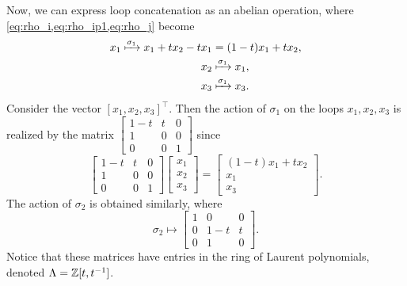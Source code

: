 \begin{example}
    \begin{figure}[h!]
        \centering
        
        \label{fig:Burau_D3}
    \end{figure}

    Now, we can express loop concatenation as an abelian operation, where \cref{eq:rho_i,eq:rho_ip1,eq:rho_j} become
    \begin{align}
        x_1 \xmapsto{\sigma_1} x_1 + tx_2 - tx_1 &= (1-t)x_1 + tx_2, \\
        x_{2} &\xmapsto{\sigma_1} x_1, \\
        x_3 &\xmapsto{\sigma_1} x_3.
    \end{align}
    Consider the vector $[x_1, x_2, x_3]^\top$. Then the action of $\sigma_1$ on the loops $x_1,x_2,x_3$ is realized by the matrix $\begin{bmatrix}
        1-t & t & 0 \\ 1 & 0 & 0 \\ 0 & 0 & 1
    \end{bmatrix}$ since
    \begin{equation}
        \begin{bmatrix}
            1-t & t & 0 \\ 1 & 0 & 0 \\ 0 & 0 & 1
        \end{bmatrix}\begin{bmatrix}
            x_1 \\ x_2 \\ x_3
        \end{bmatrix} = \begin{bmatrix}
            (1-t)x_1 + tx_2 \\ x_1 \\ x_3
        \end{bmatrix}.
    \end{equation}
    The action of $\sigma_2$ is obtained similarly, where
    \begin{equation}
        \sigma_2 \mapsto \begin{bmatrix}
            1 & 0 & 0 \\ 0 & 1-t & t \\ 0 & 1 & 0
        \end{bmatrix}.
    \end{equation}
    Notice that these matrices have entries in the ring of Laurent polynomials, denoted $\Lambda=\mathbb{Z}[t,{ t }^{-1}]$.
\end{example}

